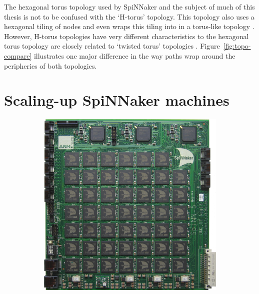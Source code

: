 		The hexagonal torus topology used by SpiNNaker and the subject of much of
		this thesis is not to be confused with the `H-torus' topology.  This
		topology also uses a hexagonal tiling of nodes and even wraps this tiling
		into in a torus-like topology \cite{zhao08}. However, H-torus topologies
		have very different characteristics to the hexagonal torus topology are
		closely related to `twisted torus' topologies \cite{camara10}.
		Figure~\ref{fig:topo-compare} illustrates one major difference in the way
		paths wrap around the peripheries of both topologies.
	
	\section{Scaling-up SpiNNaker machines}
		
		\begin{figure}
			\center
			\begin{subfigure}[b]{0.45\linewidth}
				\center
				\includegraphics[width=\linewidth]{figures/spinnakerBoard.jpg}
				

\end{subfigure}
\end{figure}
